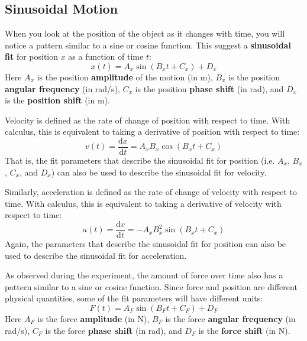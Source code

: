 \subsection{Sinusoidal Motion}
%
When you look at the position of the object as it changes with time, you will notice a pattern similar to a sine or cosine function. This suggest a \textbf{sinusoidal fit} for position $x$ as a function of time $t$:
\begin{equation}
    x(t) = A_{x} \sin\left( B_{x}t + C_{x} \right) + D_{x}
\end{equation}
Here $A_{x}$ is the position \textbf{amplitude} of the motion (in m), $B_{x}$ is the position \textbf{angular frequency} (in rad/s), $C_{x}$ is the position \textbf{phase shift} (in rad), and $D_{x}$ is the \textbf{position shift} (in m).

Velocity is defined as the rate of change of position with respect to time. With calculus, this is equivalent to taking a derivative of position with respect to time:
\begin{equation}
    v(t) = \frac{\mathrm{d} x}{\mathrm{d} t} = A_{x}B_{x} \cos\left( B_{x}t + C_{x} \right)
    \label{eq.11.v}
\end{equation}
That is, the fit parameters that describe the sinusoidal fit for position (i.e. $A_{x}$, $B_{x}$, $C_{x}$, and $D_{x}$) can also be used to describe the sinusoidal fit for velocity.

Similarly, acceleration is defined as the rate of change of velocity with respect to time. With calculus, this is equivalent to taking a derivative of velocity with respect to time:
\begin{equation}
    a(t) = \frac{\mathrm{d} v}{\mathrm{d} t} = -A_{x}B^{2}_{x} \sin\left( B_{x}t + C_{x} \right)
    \label{eq.11.a}
\end{equation}
Again, the parameters that describe the sinusoidal fit for position can also be used to describe the sinusoidal fit for acceleration.

As observed during the experiment, the amount of force over time also has a pattern similar to a sine or cosine function. Since force and position are different physical quantities, some of the fit parameters will have different units:
\begin{equation}
    F(t) = A_{F} \sin\left(B_{F} t + C_{F}\right) + D_{F}
\end{equation}
Here $A_{F}$ is the force \textbf{amplitude} (in N), $B_{F}$ is the force \textbf{angular frequency} (in rad/s), $C_{F}$ is the force \textbf{phase shift} (in rad), and $D_{F}$ is the \textbf{force shift} (in N).

